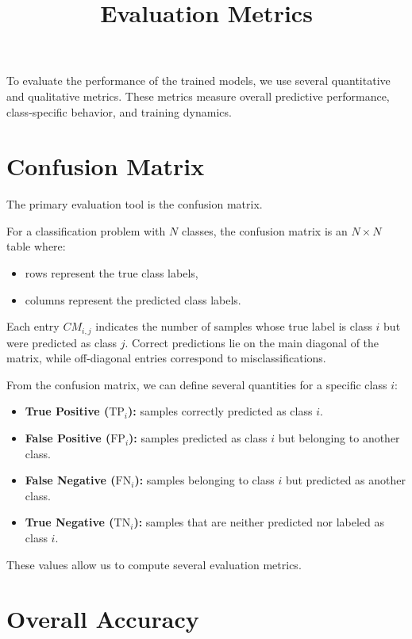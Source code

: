 \documentclass[11pt]{article}
\title{Evaluation Metrics}
\date{}
\begin{document}
\maketitle

To evaluate the performance of the trained models, we use several quantitative and qualitative metrics. These metrics measure overall predictive performance, class-specific behavior, and training dynamics.

\section{Confusion Matrix}

The primary evaluation tool is the confusion matrix.

For a classification problem with $N$ classes, the confusion matrix is an $N \times N$ table where:

\begin{itemize}
	\item rows represent the true class labels,
	\item columns represent the predicted class labels.
\end{itemize}

Each entry $CM_{i,j}$ indicates the number of samples whose true label is class $i$ but were predicted as class $j$. Correct predictions lie on the main diagonal of the matrix, while off-diagonal entries correspond to misclassifications.

From the confusion matrix, we can define several quantities for a specific class $i$:

\begin{itemize}
	\item \textbf{True Positive ($\mathrm{TP}_i$):} samples correctly predicted as class $i$.
	\item \textbf{False Positive ($\mathrm{FP}_i$):} samples predicted as class $i$ but belonging to another class.
	\item \textbf{False Negative ($\mathrm{FN}_i$):} samples belonging to class $i$ but predicted as another class.
	\item \textbf{True Negative ($\mathrm{TN}_i$):} samples that are neither predicted nor labeled as class $i$.
\end{itemize}

These values allow us to compute several evaluation metrics.

\section{Overall Accuracy}
\end{document}

